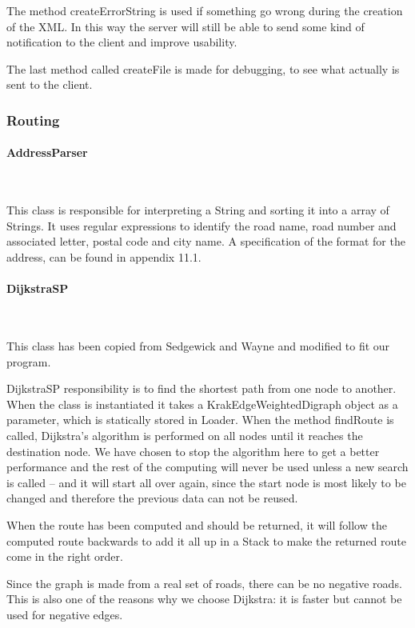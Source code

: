 \documentclass[a4paper,10pt,titlepage]{article}
\begin{document}
The method createErrorString is used if something go wrong during the creation of the XML. In this way the server will still be able to send some kind of notification to the client and improve usability.

The last method called createFile is made for debugging, to see what actually is sent to the client.

			\newpage
			\subsubsection{Routing}\mbox{}
				\paragraph{AddressParser}\mbox{}\

This class is responsible for interpreting a String and sorting it into a array of Strings. It uses regular expressions to identify the road name, road number and associated letter, postal code and city name. A specification of the format for the address, can be found in appendix 11.1.
				
				\paragraph{DijkstraSP \cite{sedgewickAndWayneDijkstraSP}}\mbox{}\
				

This class has been copied from Sedgewick and Wayne and modified to fit our program. 

DijkstraSP responsibility is to find the shortest path from one node to another. When the class is instantiated it takes a KrakEdgeWeightedDigraph object as a parameter, which is statically stored in Loader. When the method findRoute is called, Dijkstra’s algorithm is performed on all nodes until it reaches the destination node. We have chosen to stop the algorithm here to get a better performance and the rest of the computing will never be used unless a new search is called – and it will start all over again, since the start node is most likely to be changed and therefore the previous data can not be reused.

When the route has been computed and should be returned, it will follow the computed route backwards to add it all up in a Stack to make the returned route come in the right order.

Since the graph is made from a real set of roads, there can be no negative roads. This is also one of the reasons why we choose Dijkstra: it is faster but cannot be used for negative edges.
\end{document}
